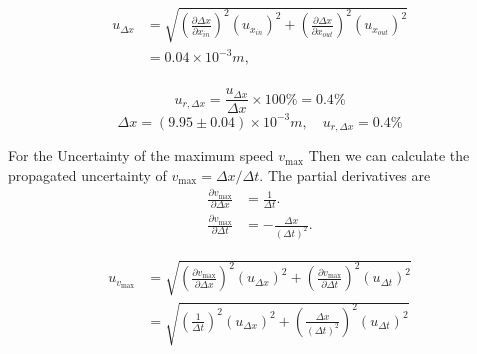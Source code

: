 \[
\begin{split}
    u_{\Delta x}&=\sqrt{(\frac{\partial\Delta x}{\partial x_{in}})^2(u_{x_{in}})^2
	+(\frac{\partial\Delta x}{\partial x_{out}})^2(u_{x_{out}})^2}\\ 
    &=0.04\times10^{-3}m,\\
\end{split}
\]

$$    u_{r,\Delta x}=\frac{u_{\Delta x}}{\Delta x}\times100\%=0.4\% $$
$$     \Delta x=(9.95\pm0.04)\times10^{-3}m,\quad u_{r,\Delta x}=0.4\%  $$

For the Uncertainty of the maximum speed $v_{\max}$
Then we can calculate the propagated uncertainty of $v_{\max}=\Delta x/\Delta t$. The partial derivatives are
\[
\begin{split}
    \frac{\partial v_{\max}}{\partial \Delta x}&=\frac{1}{\Delta t}.\\[0.5cm]
    \frac{\partial v_{\max}}{\partial \Delta t}&= - \frac{\Delta x}{(\Delta t)^2}.    
\end{split}    
\]

\[
\begin{split}
    u_{v_{\max}}&=\sqrt{(\frac{\partial v_{\max}}{\partial \Delta x})^2(u_{\Delta x})^2+(\frac{\partial v_{\max}}{\partial \Delta t})^2(u_{\Delta t})^2}     \\
    &=\sqrt{(\frac{1}{\Delta t})^2(u_{\Delta x})^2+(\frac{\Delta x}{(\Delta t)^2})^2(u_{\Delta t})^2}
\end{split}
\]
